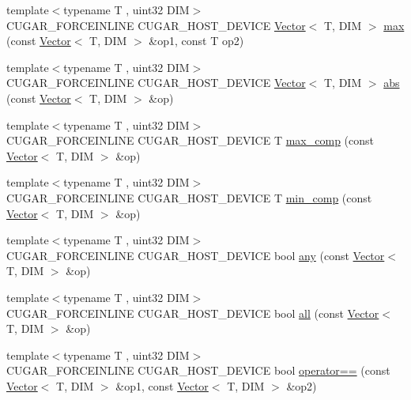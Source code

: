 \begin{DoxyCompactItemize}
\item 
{\footnotesize template$<$typename T , uint32 D\+IM$>$ }\\C\+U\+G\+A\+R\+\_\+\+F\+O\+R\+C\+E\+I\+N\+L\+I\+NE C\+U\+G\+A\+R\+\_\+\+H\+O\+S\+T\+\_\+\+D\+E\+V\+I\+CE \hyperlink{structcugar_1_1_vector}{Vector}$<$ T, D\+IM $>$ \hyperlink{group___vectors_module_ga1a6359b28fbccfa3f5bfcea7e6fe4ea2}{max} (const \hyperlink{structcugar_1_1_vector}{Vector}$<$ T, D\+IM $>$ \&op1, const T op2)
\item 
{\footnotesize template$<$typename T , uint32 D\+IM$>$ }\\C\+U\+G\+A\+R\+\_\+\+F\+O\+R\+C\+E\+I\+N\+L\+I\+NE C\+U\+G\+A\+R\+\_\+\+H\+O\+S\+T\+\_\+\+D\+E\+V\+I\+CE \hyperlink{structcugar_1_1_vector}{Vector}$<$ T, D\+IM $>$ \hyperlink{group___vectors_module_gaa8c18c612c2f31b5e74fc5691ad470a5}{abs} (const \hyperlink{structcugar_1_1_vector}{Vector}$<$ T, D\+IM $>$ \&op)
\item 
{\footnotesize template$<$typename T , uint32 D\+IM$>$ }\\C\+U\+G\+A\+R\+\_\+\+F\+O\+R\+C\+E\+I\+N\+L\+I\+NE C\+U\+G\+A\+R\+\_\+\+H\+O\+S\+T\+\_\+\+D\+E\+V\+I\+CE T \hyperlink{group___vectors_module_ga7f23c3728cf66940e1594ff0e500c980}{max\+\_\+comp} (const \hyperlink{structcugar_1_1_vector}{Vector}$<$ T, D\+IM $>$ \&op)
\item 
{\footnotesize template$<$typename T , uint32 D\+IM$>$ }\\C\+U\+G\+A\+R\+\_\+\+F\+O\+R\+C\+E\+I\+N\+L\+I\+NE C\+U\+G\+A\+R\+\_\+\+H\+O\+S\+T\+\_\+\+D\+E\+V\+I\+CE T \hyperlink{group___vectors_module_gab08d95708b6fb15681a6707d125bf692}{min\+\_\+comp} (const \hyperlink{structcugar_1_1_vector}{Vector}$<$ T, D\+IM $>$ \&op)
\item 
{\footnotesize template$<$typename T , uint32 D\+IM$>$ }\\C\+U\+G\+A\+R\+\_\+\+F\+O\+R\+C\+E\+I\+N\+L\+I\+NE C\+U\+G\+A\+R\+\_\+\+H\+O\+S\+T\+\_\+\+D\+E\+V\+I\+CE bool \hyperlink{group___vectors_module_ga5460a1891f5ee6364953a20e809bfb54}{any} (const \hyperlink{structcugar_1_1_vector}{Vector}$<$ T, D\+IM $>$ \&op)
\item 
{\footnotesize template$<$typename T , uint32 D\+IM$>$ }\\C\+U\+G\+A\+R\+\_\+\+F\+O\+R\+C\+E\+I\+N\+L\+I\+NE C\+U\+G\+A\+R\+\_\+\+H\+O\+S\+T\+\_\+\+D\+E\+V\+I\+CE bool \hyperlink{group___vectors_module_ga55cb44646b6c09c1f83053dbf45474fb}{all} (const \hyperlink{structcugar_1_1_vector}{Vector}$<$ T, D\+IM $>$ \&op)
\item 
{\footnotesize template$<$typename T , uint32 D\+IM$>$ }\\C\+U\+G\+A\+R\+\_\+\+F\+O\+R\+C\+E\+I\+N\+L\+I\+NE C\+U\+G\+A\+R\+\_\+\+H\+O\+S\+T\+\_\+\+D\+E\+V\+I\+CE bool \hyperlink{group___vectors_module_ga04e707ea52066620e6b6d0e6672712e7}{operator==} (const \hyperlink{structcugar_1_1_vector}{Vector}$<$ T, D\+IM $>$ \&op1, const \hyperlink{structcugar_1_1_vector}{Vector}$<$ T, D\+IM $>$ \&op2)

\end{DoxyCompactItemize}
